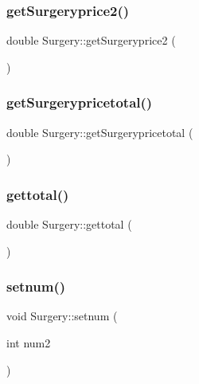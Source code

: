 \subsubsection{\texorpdfstring{getSurgeryprice2()}{getSurgeryprice2()}}
{\footnotesize\ttfamily double Surgery\+::get\+Surgeryprice2 (\begin{DoxyParamCaption}{ }\end{DoxyParamCaption})\hspace{0.3cm}{\ttfamily [inline]}}

\mbox{\label{class_surgery_a1f4a111498f7852cb0d20a3506463d98}} 
\subsubsection{\texorpdfstring{getSurgerypricetotal()}{getSurgerypricetotal()}}
{\footnotesize\ttfamily double Surgery\+::get\+Surgerypricetotal (\begin{DoxyParamCaption}{ }\end{DoxyParamCaption})\hspace{0.3cm}{\ttfamily [inline]}}

\mbox{\label{class_surgery_ad8554eac6e0afe051a2fc0e3c32ea296}} 
\subsubsection{\texorpdfstring{gettotal()}{gettotal()}}
{\footnotesize\ttfamily double Surgery\+::gettotal (\begin{DoxyParamCaption}{ }\end{DoxyParamCaption})\hspace{0.3cm}{\ttfamily [inline]}}

\mbox{\label{class_surgery_a8fdc1b9a5eb5fc5bcd8b61f169f2e4ec}} 
\subsubsection{\texorpdfstring{setnum()}{setnum()}}
{\footnotesize\ttfamily void Surgery\+::setnum (\begin{DoxyParamCaption}\item[{int}]{num2 }\end{DoxyParamCaption})\hspace{0.3cm}{\ttfamily [inline]}}



